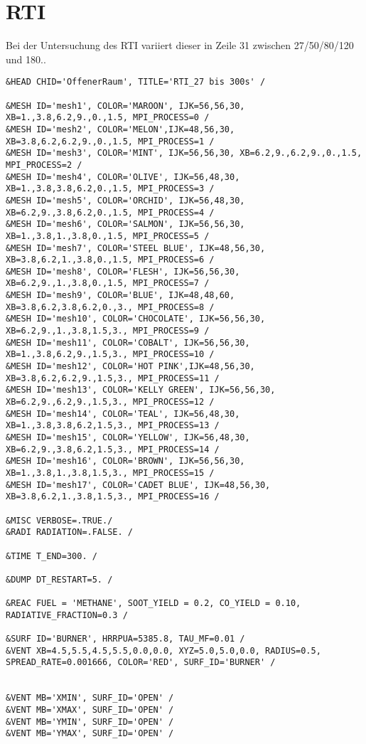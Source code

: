 \section{RTI}
Bei der Untersuchung des RTI variiert dieser in Zeile 31 zwischen 27/50/80/120 und 180..
\begin{lstlisting}[emptylines=0,basicstyle=\tiny]
&HEAD CHID='OffenerRaum', TITLE='RTI_27 bis 300s' /

&MESH ID='mesh1', COLOR='MAROON', IJK=56,56,30, XB=1.,3.8,6.2,9.,0.,1.5, MPI_PROCESS=0 /
&MESH ID='mesh2', COLOR='MELON',IJK=48,56,30, XB=3.8,6.2,6.2,9.,0.,1.5, MPI_PROCESS=1 /
&MESH ID='mesh3', COLOR='MINT', IJK=56,56,30, XB=6.2,9.,6.2,9.,0.,1.5, MPI_PROCESS=2 /
&MESH ID='mesh4', COLOR='OLIVE', IJK=56,48,30, XB=1.,3.8,3.8,6.2,0.,1.5, MPI_PROCESS=3 /
&MESH ID='mesh5', COLOR='ORCHID', IJK=56,48,30, XB=6.2,9.,3.8,6.2,0.,1.5, MPI_PROCESS=4 /
&MESH ID='mesh6', COLOR='SALMON', IJK=56,56,30, XB=1.,3.8,1.,3.8,0.,1.5, MPI_PROCESS=5 /
&MESH ID='mesh7', COLOR='STEEL BLUE', IJK=48,56,30, XB=3.8,6.2,1.,3.8,0.,1.5, MPI_PROCESS=6 /
&MESH ID='mesh8', COLOR='FLESH', IJK=56,56,30, XB=6.2,9.,1.,3.8,0.,1.5, MPI_PROCESS=7 /
&MESH ID='mesh9', COLOR='BLUE', IJK=48,48,60, XB=3.8,6.2,3.8,6.2,0.,3., MPI_PROCESS=8 /
&MESH ID='mesh10', COLOR='CHOCOLATE', IJK=56,56,30, XB=6.2,9.,1.,3.8,1.5,3., MPI_PROCESS=9 /
&MESH ID='mesh11', COLOR='COBALT', IJK=56,56,30, XB=1.,3.8,6.2,9.,1.5,3., MPI_PROCESS=10 /
&MESH ID='mesh12', COLOR='HOT PINK',IJK=48,56,30, XB=3.8,6.2,6.2,9.,1.5,3., MPI_PROCESS=11 /
&MESH ID='mesh13', COLOR='KELLY GREEN', IJK=56,56,30, XB=6.2,9.,6.2,9.,1.5,3., MPI_PROCESS=12 /
&MESH ID='mesh14', COLOR='TEAL', IJK=56,48,30, XB=1.,3.8,3.8,6.2,1.5,3., MPI_PROCESS=13 /
&MESH ID='mesh15', COLOR='YELLOW', IJK=56,48,30, XB=6.2,9.,3.8,6.2,1.5,3., MPI_PROCESS=14 /
&MESH ID='mesh16', COLOR='BROWN', IJK=56,56,30, XB=1.,3.8,1.,3.8,1.5,3., MPI_PROCESS=15 /
&MESH ID='mesh17', COLOR='CADET BLUE', IJK=48,56,30, XB=3.8,6.2,1.,3.8,1.5,3., MPI_PROCESS=16 /

&MISC VERBOSE=.TRUE./
&RADI RADIATION=.FALSE. /

&TIME T_END=300. /

&DUMP DT_RESTART=5. /

&REAC FUEL = 'METHANE', SOOT_YIELD = 0.2, CO_YIELD = 0.10, RADIATIVE_FRACTION=0.3 /

&SURF ID='BURNER', HRRPUA=5385.8, TAU_MF=0.01 /
&VENT XB=4.5,5.5,4.5,5.5,0.0,0.0, XYZ=5.0,5.0,0.0, RADIUS=0.5, SPREAD_RATE=0.001666, COLOR='RED', SURF_ID='BURNER' /


&VENT MB='XMIN', SURF_ID='OPEN' /  
&VENT MB='XMAX', SURF_ID='OPEN' /  
&VENT MB='YMIN', SURF_ID='OPEN' /  
&VENT MB='YMAX', SURF_ID='OPEN' / 
 

\end{lstlisting}

